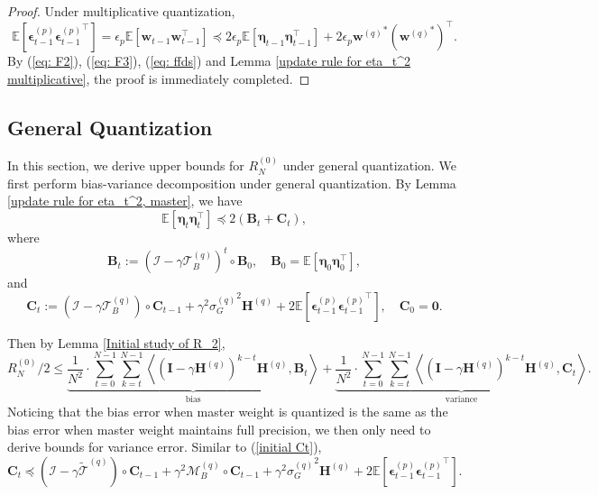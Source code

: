 \documentclass[11pt, letterpaper]{article}
\begin{document}
\begin{proof}
    Under multiplicative quantization,
    \begin{equation}
        \label{eq: ffds}
        \mathbb{E}\left[\boldsymbol{\epsilon}_{t-1}^{(p)}{\boldsymbol{\epsilon}_{t-1}^{(p)}}^\top\right]=\epsilon_p\mathbb{E}\left[\mathbf{w}_{t-1}\mathbf{w}_{t-1}^\top\right]\preceq2\epsilon_p\mathbb{E}\left[\boldsymbol{\eta}_{t-1}\boldsymbol{\eta}_{t-1}^\top\right]+2\epsilon_p{\mathbf{w}^{(q)}}^*({\mathbf{w}^{(q)}}^*)^\top.
    \end{equation}
    By (\ref{eq: F2}), (\ref{eq: F3}), (\ref{eq: ffds}) and Lemma \ref{update rule for eta_t^2 multiplicative},
    the proof is immediately completed.
\end{proof}


\subsection{General Quantization}
In this section, we derive upper bounds for $R_N^{(0)}$ under general quantization.
We first perform bias-variance decomposition under general quantization. By Lemma \ref{update rule for eta_t^2, master}, we have 
\begin{equation*}
    \mathbb{E}\left[\boldsymbol{\eta}_t\boldsymbol{\eta}_t^\top\right]\preceq2\left(\mathbf{B}_t+\mathbf{C}_t\right),
\end{equation*}
where
\begin{equation*}
    \mathbf{B}_t:=(\mathcal{I}-\gamma\mathcal{T}_B^{(q)})^t \circ \mathbf{B}_0, \quad \mathbf{B}_0=\mathbb{E}\left[\boldsymbol{\eta}_0 \boldsymbol{\eta}_0^\top\right],
\end{equation*}
and
\begin{equation*}
    \mathbf{C}_t := (\mathcal{I}-\gamma \mathcal{T}_B^{(q)})\circ\mathbf{C}_{t-1}+\gamma^2 {\sigma_G^{(q)}}^2\mathbf{H}^{(q)}+2\mathbb{E}\left[\boldsymbol{\epsilon}_{t-1}^{(p)}{\boldsymbol{\epsilon}_{t-1}^{(p)}}^\top\right],\quad \mathbf{C}_0=\boldsymbol{0}.
\end{equation*}

Then by Lemma \ref{Initial study of R_2},
\begin{equation}
    \label{eq: f}
    R_N^{(0)}/2\leq \underbrace{\frac{1}{N^2}\cdot\sum_{t=0}^{N-1}\sum_{k=t}^{N-1}\left\langle(\mathbf{I}-\gamma\mathbf{H}^{(q)})^{k-t}\mathbf{H}^{(q)},\mathbf{B}_t\right\rangle}_{\mathrm{bias}}+\underbrace{\frac{1}{N^2}\cdot\sum_{t=0}^{N-1}\sum_{k=t}^{N-1}\left\langle(\mathbf{I}-\gamma\mathbf{H}^{(q)})^{k-t}\mathbf{H}^{(q)},\mathbf{C}_t\right\rangle}_{\mathrm{variance}}.
\end{equation}
Noticing that the bias error when master weight is quantized is the same as the bias error when master weight maintains full precision, we then only need to derive bounds for variance error. 
Similar to (\ref{initial Ct}),
\begin{equation}
    \label{eq: ff}
    \mathbf{C}_t\preceq (\mathcal{I}-\gamma\widetilde{\mathcal{T}}^{(q)})\circ \mathbf{C}_{t-1}+\gamma^2\mathcal{M}_B^{(q)}\circ \mathbf{C}_{t-1}+\gamma^2{\sigma_G^{(q)}}^2\mathbf{H}^{(q)}+2\mathbb{E}\left[\boldsymbol{\epsilon}_{t-1}^{(p)}{\boldsymbol{\epsilon}_{t-1}^{(p)}}^\top\right].
\end{equation}
\end{document}
